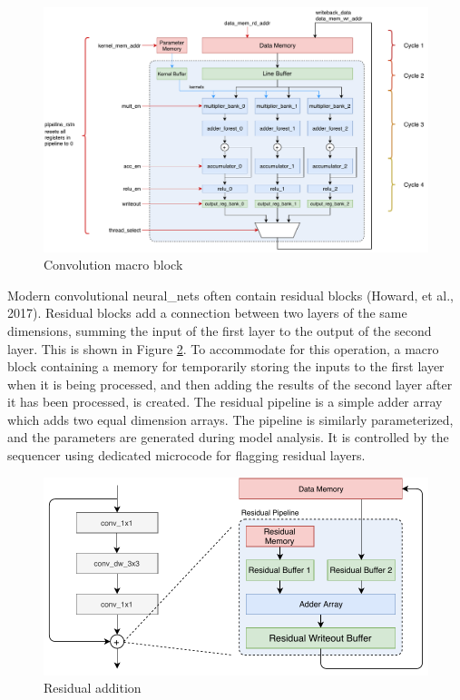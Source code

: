 \documentclass{uw-ece-wkrpt}
\begin{document}
\begin{figure}
\centering
\includegraphics[width=\textwidth]{figures/convolution_macro}
\caption{Convolution macro block \cite{Ma2017An-automatic-RT}}\label{fig:convolution_macro}
\end{figure}

Modern convolutional \glspl{neural_net} often contain residual blocks (Howard, et al., 2017). Residual blocks add a connection between two layers of the same dimensions, summing the input of the first layer to the output of the second layer. This is shown in Figure \ref{fig:residual_addition}. To accommodate for this operation, a macro block containing a memory for temporarily storing the inputs to the first layer when it is being processed, and then adding the results of the second layer after it has been processed, is created. The residual pipeline is a simple adder array which adds two equal dimension arrays. The pipeline is similarly parameterized, and the parameters are generated during model analysis. It is controlled by the sequencer using dedicated microcode for flagging residual layers.

\begin{figure}
\centering
\includegraphics{figures/residual_addition}
\caption{Residual addition}\label{fig:residual_addition}
\end{figure}
\end{document}
